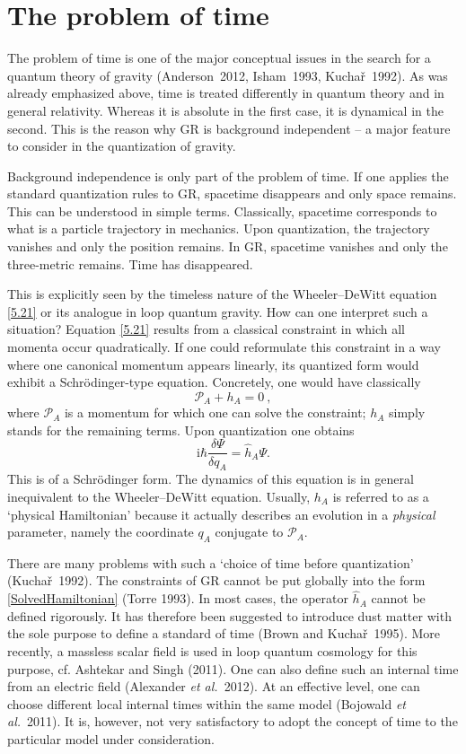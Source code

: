 \documentclass[12pt,a4paper]{article}
\newcommand{\be}{\begin{equation}}
\newcommand{\ee}{\end{equation}}
\newcommand{\lb}{\label}
\begin{document}
\section{The problem of time}  


The problem of time is one of the major conceptual issues in the
search for a quantum theory of gravity (Anderson~2012, Isham~1993,
Kucha\v{r}~1992). 
As was already emphasized above, time is treated
differently in quantum theory and in general relativity. Whereas it is
absolute in the first case, it is dynamical in the second. This is
the reason why GR is background independent -- a major feature to
consider in the quantization of gravity.

Background independence is only part of the problem of time. If one  
applies the standard quantization rules to GR, spacetime disappears
and only space remains. This can be understood in simple
terms. Classically, spacetime corresponds to what is a particle
trajectory in mechanics. Upon quantization, the trajectory vanishes and only the
position remains. In GR, spacetime vanishes and only the three-metric
remains. Time has disappeared. 

This is explicitly seen by the timeless nature of the Wheeler--DeWitt
equation \eqref{5.21} or its analogue in loop quantum gravity. How can
one interpret such a situation? Equation \eqref{5.21} results from a
classical constraint in which all momenta occur quadratically. If one
could reformulate this constraint in a way where one canonical momentum
appears linearly, its quantized form would exhibit a
Schr\"odinger-type equation. Concretely, one would have classically
\be
\lb{SolvedHamiltonian}
\mathcal{P}_A+h_A=0\ ,
\ee
where $\mathcal{P}_A$ is a momentum for which
one can solve the constraint; $h_A$ simply stands for the remaining terms.
Upon quantization one obtains
\be
\lb{effectiveS}
\mathrm{i}\hbar\frac{\delta\Psi}{\delta q_A}=\widehat{h}_A\Psi.
\ee
This is of a Schr\"odinger form. 
The dynamics of this equation is
  in general inequivalent to the Wheeler--DeWitt equation.
Usually, $h_A$ is referred to as a `physical Hamiltonian' because it
actually describes an evolution in a {\it physical} parameter, namely the
coordinate $q_A$ conjugate to $\mathcal{P}_A$. 

There are many problems with such a `choice of time before
quantization' (Kucha\v{r}~1992). The constraints of GR cannot be put
globally into the form \eqref{SolvedHamiltonian} (Torre 1993). In most
cases, the operator $\widehat{h}_A$ cannot be defined rigorously. 
It has therefore been suggested to introduce dust matter with the sole
purpose to define a standard of time (Brown and Kucha\v{r}~1995). More
recently, a massless scalar field is used in loop quantum cosmology 
for this purpose, cf. Ashtekar and Singh (2011). One can also define
such an internal time from an electric field (Alexander {\em et
  al.}~2012). At an effective level, one can choose different local internal
times within the same model (Bojowald {\em et al.}~2011). It is,
however, not very satisfactory to adopt the concept of time to the
particular model under consideration.
\end{document}
